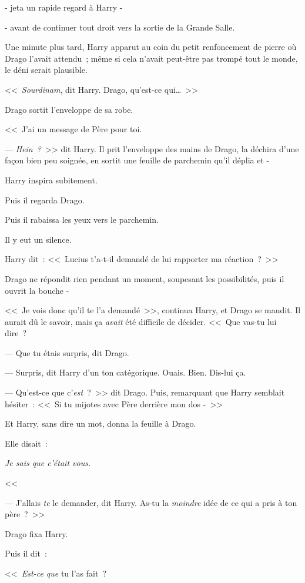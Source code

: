 - jeta un rapide regard à Harry -

- avant de continuer tout droit vers la sortie de la Grande Salle.

Une minute plus tard, Harry apparut au coin du petit renfoncement de pierre où Drago l'avait attendu~; même si cela n'avait peut-être pas trompé tout le monde, le déni serait plausible.

<<~\emph{Sourdinam}, dit Harry. Drago, qu'est-ce qui…~>>

Drago sortit l'enveloppe de sa robe.

<<~J'ai un message de Père pour toi.

--- \emph{Hein~?}~>> dit Harry. Il prit l'enveloppe des mains de Drago, la déchira d'une façon bien peu soignée, en sortit une feuille de parchemin qu'il déplia et -

Harry inspira subitement.

Puis il regarda Drago.

Puis il rabaissa les yeux vers le parchemin.

Il y eut un silence.

Harry dit~: <<~Lucius t'a-t-il demandé de lui rapporter ma réaction~?~>>

Drago ne répondit rien pendant un moment, soupesant les possibilités, puis il ouvrit la bouche -

<<~Je vois donc qu'il te l'a demandé~>>, continua Harry, et Drago se maudit. Il aurait dû le savoir, mais ça \emph{avait} été difficile de décider. <<~Que vas-tu lui dire~?

--- Que tu étais surpris, dit Drago.

--- Surpris, dit Harry d'un ton catégorique. Ouais. Bien. Dis-lui ça.

--- Qu'est-ce que c'\emph{est}~?~>> dit Drago. Puis, remarquant que Harry semblait hésiter~: <<~Si tu mijotes avec Père derrière mon dos -~>>

Et Harry, sans dire un mot, donna la feuille à Drago.

Elle disait~:

\emph{Je sais que c'était vous.}

<<~\emph{}

--- J'allais \emph{te} le demander, dit Harry. As-tu la \emph{moindre} idée de ce qui a pris à ton père~?~>>

Drago fixa Harry.

Puis il dit~:

<<~\emph{Est-ce que} tu l'as fait~?

